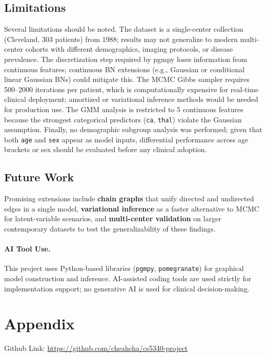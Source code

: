 \documentclass{article}
\begin{document}
\subsection{Limitations}

Several limitations should be noted. The dataset is a single-center
collection (Cleveland, 303 patients) from 1988; results may not generalize to
modern multi-center cohorts with different demographics, imaging protocols, or
disease prevalence. The discretization step required by pgmpy loses
information from continuous features; continuous BN extensions (e.g., Gaussian
or conditional linear Gaussian BNs) could mitigate this. The MCMC Gibbs
sampler requires 500--2000 iterations per patient, which is computationally
expensive for real-time clinical deployment; amortized or variational
inference methods would be needed for production use. The GMM analysis is
restricted to 5 continuous features because the strongest categorical
predictors (\texttt{ca}, \texttt{thal}) violate the Gaussian assumption.
Finally, no demographic subgroup analysis was performed; given that both
\texttt{age} and \texttt{sex} appear as model inputs, differential
performance across age brackets or sex should be evaluated before any clinical
adoption.

\subsection{Future Work}

Promising extensions include \textbf{chain graphs} that unify directed and undirected edges in a single model, \textbf{variational inference} as a faster alternative to MCMC for latent-variable scenarios, and \textbf{multi-center validation} on larger contemporary datasets to test the generalizability of these findings.

\newpage



\paragraph{AI Tool Use.}
This project uses Python-based libraries (\texttt{pgmpy}, \texttt{pomegranate}) for graphical model construction and inference. AI-assisted coding tools are used strictly for implementation support; no generative AI is used for clinical decision-making.

\newpage
\appendix

\section{Appendix}
Github Link: \url{https://github.com/cheahcha/cs5340-project}
\end{document}

